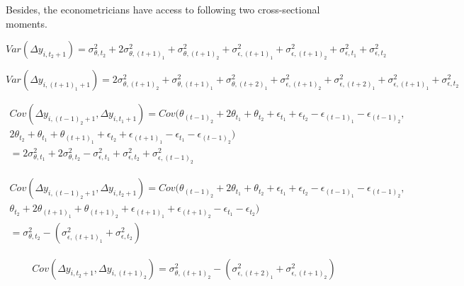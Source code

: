 \documentclass[12pt,notitlepage,onecolumn,aps,pra]{revtex4-1}
\begin{document}
Besides, the econometricians have access to following two
cross-sectional moments.

\begin{equation}
Var (\Delta y_{i,t_2+1}) =  \sigma^2_{\theta,t_2} + 2\sigma^2_{\theta,(t+1)_1} + \sigma^2_{\theta,(t+1)_2} + \sigma^2_{\epsilon,(t+1)_1} + \sigma^2_{\epsilon,(t+1)_2} + \sigma^2_{\epsilon,t_1} + \sigma^2_{\epsilon,t_2} 
\end{equation}

\begin{equation}
Var (\Delta y_{i,(t+1)_1+1}) =  2\sigma^2_{\theta,(t+1)_2} + \sigma^2_{\theta,(t+1)_1} + \sigma^2_{\theta,(t+2)_1} + \sigma^2_{\epsilon,(t+1)_2} + \sigma^2_{\epsilon,(t+2)_1} + \sigma^2_{\epsilon,(t+1)_1} + \sigma^2_{\epsilon,t_2}
\end{equation}

\begin{equation}
\begin{split}
Cov ( \Delta y_{i,(t-1)_2+1},\Delta y_{i,t_1+1}) = Cov(\theta_{(t-1)_2} + 2\theta_{t_1} + \theta_{t_2} + \epsilon_{t_1} + \epsilon_{t_2} - \epsilon_{(t-1)_1} - \epsilon_{(t-1)_2} , \\
2\theta_{t_2} + \theta_{t_1} + \theta_{(t+1)_1} + \epsilon_{t_2} + \epsilon_{(t+1)_1} - \epsilon_{t_1} - \epsilon_{(t-1)_2 } ) \\
= 2\sigma^2_{\theta,t_1} + 2\sigma^2_{\theta,t_2} - \sigma^2_{\epsilon,t_1} + \sigma^2_{\epsilon,t_2} + \sigma^2_{\epsilon,(t-1)_2}
\end{split}
\end{equation}

\begin{equation}
\begin{split}
Cov ( \Delta y_{i,(t-1)_2+1},\Delta y_{i,t_2+1}) = Cov(\theta_{(t-1)_2} + 2\theta_{t_1} + \theta_{t_2} + \epsilon_{t_1} + \epsilon_{t_2} - \epsilon_{(t-1)_1} - \epsilon_{(t-1)_2} , \\
\theta_{t_2} + 2\theta_{(t+1)_1} + \theta_{(t+1)_2} + \epsilon_{(t+1)_1} + \epsilon_{(t+1)_2} - \epsilon_{t_1} - \epsilon_{t_2} ) \\
= \sigma^2_{\theta,t_2}-(\sigma^2_{\epsilon,(t+1)_1} + \sigma^2_{\epsilon,t_2})
\end{split}
\end{equation}

\begin{equation}
\begin{split}
Cov ( \Delta y_{i,t_2+1},\Delta y_{i,(t+1)_2}) = \sigma^2_{\theta,(t+1)_2}-(\sigma^2_{\epsilon,(t+2)_1} + \sigma^2_{\epsilon,(t+1)_2})
\end{split}
\end{equation}
\end{document}
